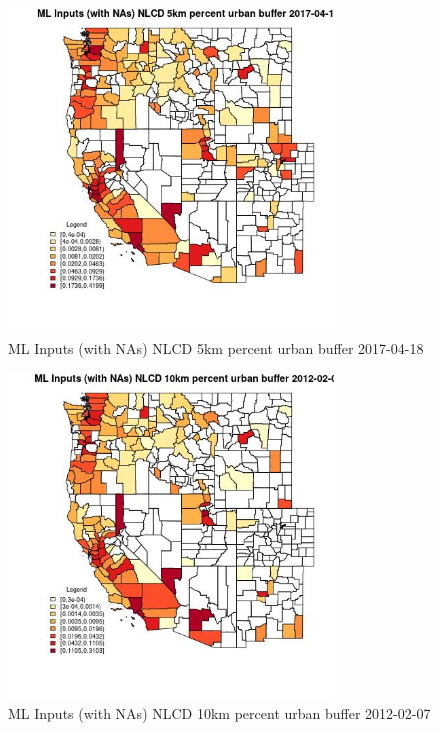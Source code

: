 \begin{figure} 
\centering  
\includegraphics[width=0.77\textwidth]{Code_Outputs/Report_ML_input_PM25_Step4_part_f_de_duplicated_aves_prioritize_24hr_obswNAs_CountyNLCD_5km_percent_urban_bufferMean2017-04-18.jpg} 
\caption{\label{fig:Report_ML_input_PM25_Step4_part_f_de_duplicated_aves_prioritize_24hr_obswNAsCountyNLCD_5km_percent_urban_bufferMean2017-04-18}ML Inputs (with NAs) NLCD 5km percent urban buffer 2017-04-18} 
\end{figure} 
 

\begin{figure} 
\centering  
\includegraphics[width=0.77\textwidth]{Code_Outputs/Report_ML_input_PM25_Step4_part_f_de_duplicated_aves_prioritize_24hr_obswNAs_CountyNLCD_10km_percent_urban_bufferMean2012-02-07.jpg} 
\caption{\label{fig:Report_ML_input_PM25_Step4_part_f_de_duplicated_aves_prioritize_24hr_obswNAsCountyNLCD_10km_percent_urban_bufferMean2012-02-07}ML Inputs (with NAs) NLCD 10km percent urban buffer 2012-02-07} 
\end{figure} 
 

